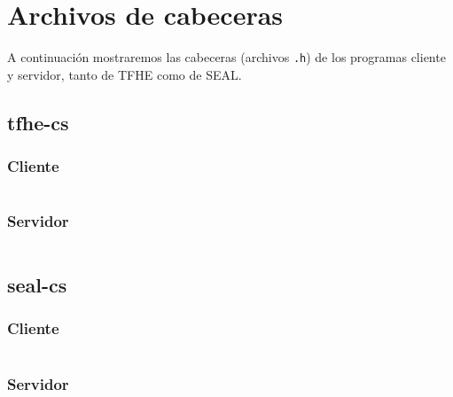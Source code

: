 \chapter{Archivos de cabeceras}
\label{appendix:cs-headers}

A continuación mostraremos las cabeceras (archivos \verb|.h|) de los programas cliente y servidor, tanto de TFHE como de SEAL.

\section{tfhe-cs}

\subsection{Cliente}

\inputminted{c++}{apendices/tfhe-cs/client.h}

\subsection{Servidor}

\inputminted{c++}{apendices/tfhe-cs/server.h}

\section{seal-cs}

\subsection{Cliente}

\inputminted{c++}{apendices/seal-cs/client.h}

\subsection{Servidor}

\inputminted{c++}{apendices/seal-cs/server.h}
